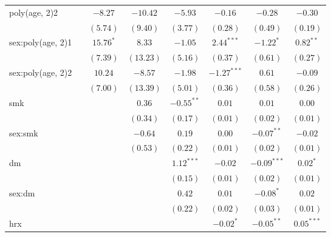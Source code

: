 \begin{tabular}{l c c c c c c c}
poly(age, 2)2        &               & $-8.27$        & $-10.42$      & $-5.93$       & $-0.16$       & $-0.28$       & $-0.30$       \\
                     &               & $(5.74)$       & $(9.40)$      & $(3.77)$      & $(0.28)$      & $(0.49)$      & $(0.19)$      \\
sex:poly(age, 2)1    &               & $15.76^{*}$    & $8.33$        & $-1.05$       & $2.44^{***}$  & $-1.22^{*}$   & $0.82^{**}$   \\
                     &               & $(7.39)$       & $(13.23)$     & $(5.16)$      & $(0.37)$      & $(0.61)$      & $(0.27)$      \\
sex:poly(age, 2)2    &               & $10.24$        & $-8.57$       & $-1.98$       & $-1.27^{***}$ & $0.61$        & $-0.09$       \\
                     &               & $(7.00)$       & $(13.39)$     & $(5.01)$      & $(0.36)$      & $(0.58)$      & $(0.26)$      \\
smk                  &               &                & $0.36$        & $-0.55^{**}$  & $0.01$        & $0.01$        & $0.00$        \\
                     &               &                & $(0.34)$      & $(0.17)$      & $(0.01)$      & $(0.02)$      & $(0.01)$      \\
sex:smk              &               &                & $-0.64$       & $0.19$        & $0.00$        & $-0.07^{**}$  & $-0.02$       \\
                     &               &                & $(0.53)$      & $(0.22)$      & $(0.01)$      & $(0.02)$      & $(0.01)$      \\
dm                   &               &                &               & $1.12^{***}$  & $-0.02$       & $-0.09^{***}$ & $0.02^{*}$    \\
                     &               &                &               & $(0.15)$      & $(0.01)$      & $(0.02)$      & $(0.01)$      \\
sex:dm               &               &                &               & $0.42$        & $0.01$        & $-0.08^{*}$   & $0.02$        \\
                     &               &                &               & $(0.22)$      & $(0.02)$      & $(0.03)$      & $(0.01)$      \\
hrx                  &               &                &               &               & $-0.02^{*}$   & $-0.05^{**}$  & $0.05^{***}$  \\

\end{tabular}
